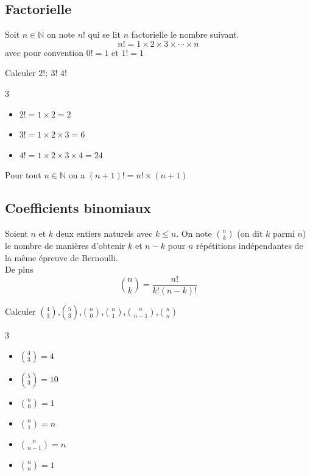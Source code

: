 \documentclass[french]{book}
\newcommand{\N}{\mathbb{N}}
\begin{document}
\subsection{Factorielle}
\begin{defn}
Soit $n\in \N$ on note $n!$ qui se lit \og $n$ factorielle \fg{} le nombre suivant.
$$n!=1\times2\times3\times\cdots\times n$$
avec pour convention $0!=1$ et $1!=1$ 
\end{defn}

\begin{exemple}
Calculer $2!;\ 3!$ $4!$
\begin{multicols}{3}
\begin{itemize}
\item[$\bullet$]$2!=1\times2=2$
\item[$\bullet$]$3!=1\times2\times3=6$
\item[$\bullet$]$4!=1\times2\times3\times4=24$
\end{itemize}
\end{multicols}
\end{exemple}

\begin{prop}
Pour tout $n \in \N$ on a $(n+1)!=n!\times(n+1)$
\end{prop}

\subsection{Coefficients binomiaux}

\begin{defn}
Soient $n$ et $k$ deux entiers naturels avec $k\leq n$. On note $\binom{n}{k}$ (on dit \og{}$k$ parmi $n$\fg{}) le nombre de manières d'obtenir $k$  et $n-k$  pour $n$ répétitions indépendantes de la même épreuve de Bernoulli. \\

De plus  $$\binom{n}{k}=\dfrac{n!}{k!(n-k)!}$$
\end{defn}

\begin{exemple}
Calculer $\binom{4}{3}$,$\binom{5}{3}$,$\binom{n}{0}$,$\binom{n}{1}$,$\binom{n}{n-1}$,$\binom{n}{n}$
\end{exemple}

\begin{multicols}{3}
\begin{itemize}
\item[$\bullet$]$\binom{4}{3}=4$
\item[$\bullet$]$\binom{5}{3}=10$
\item[$\bullet$]$\binom{n}{0}=1$
\item[$\bullet$]$\binom{n}{1}=n$
\item[$\bullet$]$\binom{n}{n-1}=n$
\item[$\bullet$]$\binom{n}{n}=1$
\end{itemize}
\end{multicols}
\end{document}

